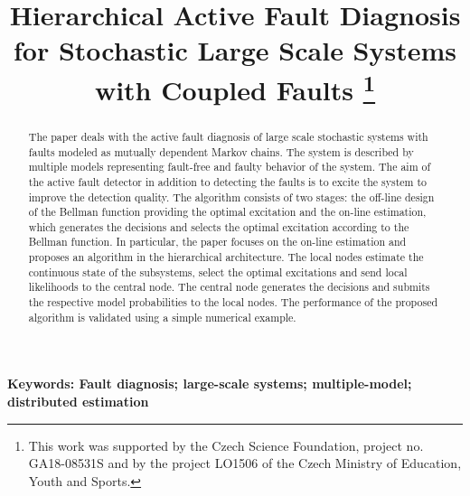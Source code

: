 \documentclass[conference,letterpaper]{IEEEtran}
\begin{document}
\title{Hierarchical Active Fault Diagnosis for Stochastic Large Scale Systems with Coupled Faults
\thanks{This work was supported by  the Czech Science Foundation, project no. GA18-08531S and by the project LO1506 of the Czech Ministry of Education, Youth and Sports.}
} 
\author{
}
\maketitle

\begin{abstract}
  The paper deals with the active fault diagnosis of large scale stochastic systems with faults modeled as mutually dependent Markov chains.
  The system is described by multiple models representing fault-free and faulty behavior of the system.
  The aim of the active fault detector in addition to detecting the faults is to excite the system to improve the detection quality.
  The algorithm consists of two stages: the off-line design of the Bellman function providing the optimal excitation and the on-line estimation, which generates the decisions and selects the optimal excitation according to the Bellman function.
  In particular, the paper focuses on the on-line estimation and proposes an algorithm in the hierarchical architecture.
  The local nodes estimate the continuous state of the subsystems, select the optimal excitations and send local likelihoods to the central node.
  The central node generates the decisions and submits the respective model probabilities to the local nodes.
  The performance of the proposed algorithm is validated using a simple numerical example.
\end{abstract}
\noindent
{\bf Keywords: Fault diagnosis; large-scale systems; multiple-model; distributed estimation}
\end{document}
